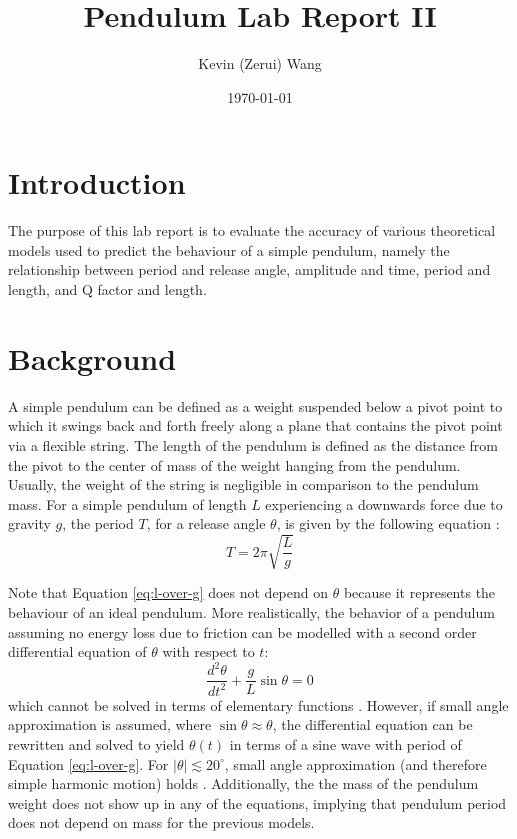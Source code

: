 \documentclass[12pt]{article}
\title{Pendulum Lab Report II}
\author{Kevin (Zerui) Wang}
\date{\today}
\begin{document}
\maketitle
\tableofcontents
\newpage

\begin{multicols}{2}


\section{Introduction}
{\color{blue}The purpose of this lab report is to evaluate the accuracy of various theoretical models used to predict the behaviour of a simple pendulum, namely the relationship between period and release angle, amplitude and time, period and length, and Q factor and length.}

\section{Background} \label{Background}
{\color{blue}A simple pendulum can be defined as a weight suspended below a pivot point to which it swings back and forth freely along a plane that contains the pivot point via a flexible string. The length of the pendulum is defined as the distance from the pivot to the center of mass of the weight hanging from the pendulum. Usually, the weight of the string is negligible in comparison to the pendulum mass.} For a simple pendulum of length $L$ experiencing a downwards force due to gravity $g$, the period $T$, for a release angle $\theta$, is given by the following equation \cite{the-simple-pendulum}:
\begin{equation} \label{eq:l-over-g}
    T = 2\pi \sqrt{\frac{L}{g}}
\end{equation}

{\color{blue}Note that Equation \ref{eq:l-over-g} does not depend on $\theta$ because it represents the behaviour of an ideal pendulum.} More realistically, the behavior of a pendulum assuming no energy loss due to friction can be modelled with a second order differential equation of $\theta$ with respect to $t$:
\begin{equation} \label{eq:diffeq-pendulum}
    \frac{d^2\theta}{dt^2} + \frac{g}{L}\sin{\theta} = 0
\end{equation}
{\color{blue}which cannot be solved in terms of elementary functions \cite{no-elementary-fns}. However, if small angle approximation is assumed, where $\sin\theta \approx \theta$, the differential equation can be rewritten and solved to yield $\theta(t)$ in terms of a sine wave with period of Equation \ref{eq:l-over-g}. For $|\theta| \lesssim 20^{\circ}$, small angle approximation (and therefore simple harmonic motion) holds \cite{the-simple-pendulum}.} Additionally, the the mass of the pendulum weight does not show up in any of the equations, implying that pendulum period does not depend on mass for the previous models.


\end{multicols}
\end{document}
